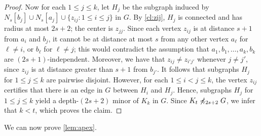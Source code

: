 \begin{proof}
Now for each $1\leq j\leq k$, let $H_j$ be the subgraph induced by $N_s[b_j]\cup N_s[a_j]\cup\{z_{ij} \colon 1\leq i\leq j\}$ in $G$.
By \cref{cl:zij}, $H_j$ is connected and has radius at most $2s+2$; the center is $z_{jj}$.
Since each vertex $z_{ij}$ is at distance $s+1$ from $a_i$ and $b_j$, it cannot be at distance at most $s$ from any other vertex $a_\ell$ for $\ell\neq i$, or $b_\ell$ for $\ell\neq j$;
this would contradict the assumption that $a_1,b_1,\ldots,a_k,b_k$ are $(2s+1)$-independent.
Moreover, we have that $z_{ij}\neq z_{i'j'}$ whenever $j\neq j'$, since $z_{ij}$ is at distance greater than $s+1$ from $b_{j'}$.
It follows that subgraphs $H_j$ for $1\leq j\leq k$ are pairwise disjoint.
However, for each $1\leq i<j\leq k$, the vertex $z_{ij}$ certifies that there is an edge in $G$ between $H_i$ and $H_j$.
Hence, subgraphs $H_j$ for $1\leq j\leq k$ yield a depth-$(2s+2)$ minor of $K_k$ in $G$.
Since $K_t\not\preccurlyeq_{2s+2} G$, we infer that $k<t$, which proves the claim.
\end{proof}

%


We can now prove \cref{lem:apex}. 

